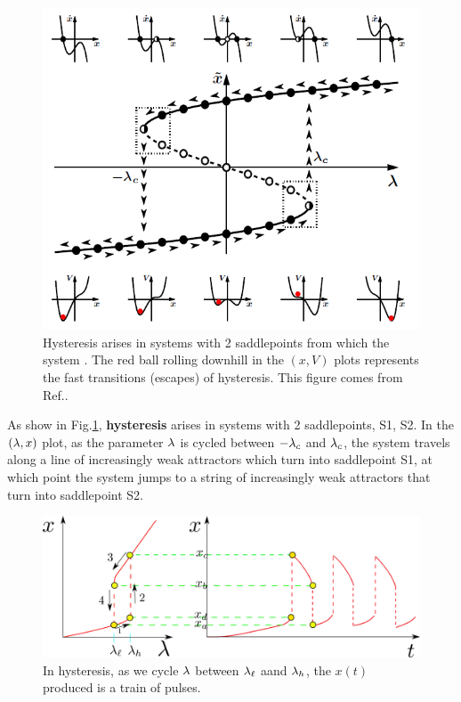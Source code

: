 \begin{figure}[h!]
 \centering
 \includegraphics[width=5in]
 {dynamical-sys/hysteresis-2-saddle-points.png}
 \caption{Hysteresis arises in systems with  2 saddlepoints from which the system . The red ball rolling downhill in the $(x,V)$
 plots represents
 the fast transitions (escapes) of hysteresis. This
 figure  comes from Ref.\cite{dynamical-fuchs}.}
 \label{fig-hysteresis-2-saddle-point}
 \end{figure}
 
 As show in Fig.\ref{fig-hysteresis-2-saddle-point}, {\bf hysteresis}
 arises in systems with 2 saddlepoints, S1, S2. In the $(\lambda, x)$ plot,
 as the parameter $\lambda$ is 
 cycled between $-\lambda_c$ and $\lambda_c$,
 the system travels along a
 line of increasingly weak attractors which turn into  saddlepoint S1, at which point the system jumps to a string of increasingly weak attractors
 that turn into saddlepoint S2.

 \begin{figure}[h!]
\centering
\includegraphics[width=5in]
{dynamical-sys/hysteresis.png}
\caption{In hysteresis,
as we cycle 
$\lambda$ between $\lambda_\ell$ aand $\lambda_h$, the $x(t)$ 
produced is a
train of pulses.}
\label{fig-hysteresis}
\end{figure}

